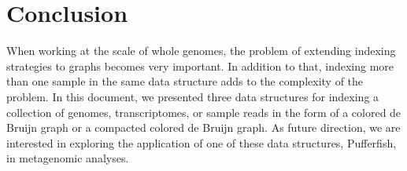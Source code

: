 \chapter{Conclusion}

When working at the scale of whole genomes,
the problem of extending indexing strategies to graphs becomes very important.
In addition to that, indexing more than one sample in the same data structure
adds to the complexity of the problem.
In this document, we presented three data structures
for indexing a collection of genomes, transcriptomes, or sample reads
in the form of a colored de Bruijn graph or a compacted colored de Bruijn graph.
As future direction, we are interested in exploring the application
of one of these data structures, Pufferfish, in metagenomic analyses.


